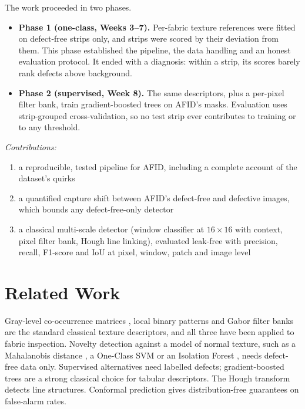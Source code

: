 \documentclass[conference]{IEEEtran}
\begin{document}
The work proceeded in two phases.
\begin{itemize}
  \item \textbf{Phase 1 (one-class, Weeks 3--7).} Per-fabric texture references were fitted on defect-free strips only, and strips were scored by their deviation from them. This phase established the pipeline, the data handling and an honest evaluation protocol. It ended with a diagnosis: within a strip, its scores barely rank defects above background.
  \item \textbf{Phase 2 (supervised, Week 8).} The same descriptors, plus a per-pixel filter bank, train gradient-boosted trees on AFID's masks. Evaluation uses strip-grouped cross-validation, so no test strip ever contributes to training or to any threshold.
\end{itemize}

\emph{Contributions:}
\begin{enumerate}
  \item a reproducible, tested pipeline for AFID, including a complete account of the dataset's quirks
  \item a quantified capture shift between AFID's defect-free and defective images, which bounds any defect-free-only detector
  \item a classical multi-scale detector (window classifier at $16\times16$ with context, pixel filter bank, Hough line linking), evaluated leak-free with precision, recall, F1-score and IoU at pixel, window, patch and image level
\end{enumerate}

\section{Related Work}
Gray-level co-occurrence matrices \cite{haralick1973}, local binary patterns \cite{ojala2002} and Gabor filter banks \cite{jain1991,daugman1985} are the standard classical texture descriptors, and all three have been applied to fabric inspection. Novelty detection against a model of normal texture, such as a Mahalanobis distance \cite{mahalanobis1936}, a One-Class SVM \cite{scholkopf2001} or an Isolation Forest \cite{liu2008}, needs defect-free data only. Supervised alternatives need labelled defects; gradient-boosted trees \cite{friedman2001,ke2017} are a strong classical choice for tabular descriptors. The Hough transform \cite{duda1972,matas2000} detects line structures. Conformal prediction \cite{vovk2005} gives distribution-free guarantees on false-alarm rates.
\end{document}
